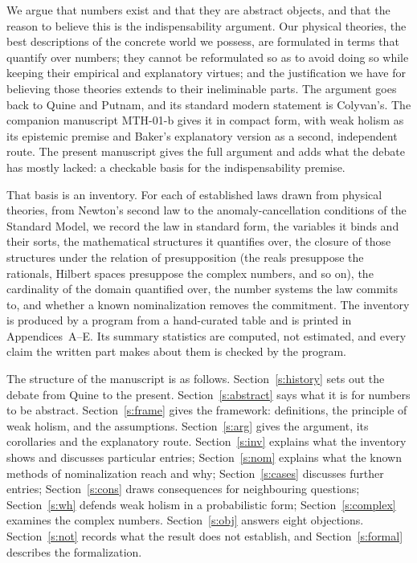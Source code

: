 \documentclass{situationist-preprint}
\begin{document}
We argue that numbers exist and that they are abstract objects, and that the reason to believe this is the indispensability argument. Our physical theories, the best descriptions of the concrete world we possess, are formulated in terms that quantify over numbers; they cannot be reformulated so as to avoid doing so while keeping their empirical and explanatory virtues; and the justification we have for believing those theories extends to their ineliminable parts. The argument goes back to Quine and Putnam, and its standard modern statement is Colyvan's. The companion manuscript MTH-01-b gives it in compact form, with weak holism as its epistemic premise and Baker's explanatory version as a second, independent route. The present manuscript gives the full argument and adds what the debate has mostly lacked: a checkable basis for the indispensability premise.

That basis is an inventory. For each of \nLaws{} established laws drawn from \nTheories{} physical theories, from Newton's second law to the anomaly-cancellation conditions of the Standard Model, we record the law in standard form, the variables it binds and their sorts, the mathematical structures it quantifies over, the closure of those structures under the relation of presupposition (the reals presuppose the rationals, Hilbert spaces presuppose the complex numbers, and so on), the cardinality of the domain quantified over, the number systems the law commits to, and whether a known nominalization removes the commitment. The inventory is produced by a program from a hand-curated table and is printed in Appendices~A--E. Its summary statistics are computed, not estimated, and every claim the written part makes about them is checked by the program.

The structure of the manuscript is as follows. Section~\ref{s:history} sets out the debate from Quine to the present. Section~\ref{s:abstract} says what it is for numbers to be abstract. Section~\ref{s:frame} gives the framework: definitions, the principle of weak holism, and the assumptions. Section~\ref{s:arg} gives the argument, its corollaries and the explanatory route. Section~\ref{s:inv} explains what the inventory shows and discusses particular entries; Section~\ref{s:nom} explains what the known methods of nominalization reach and why; Section~\ref{s:cases} discusses further entries; Section~\ref{s:cons} draws consequences for neighbouring questions; Section~\ref{s:wh} defends weak holism in a probabilistic form; Section~\ref{s:complex} examines the complex numbers. Section~\ref{s:obj} answers eight objections. Section~\ref{s:not} records what the result does not establish, and Section~\ref{s:formal} describes the formalization.
\end{document}
